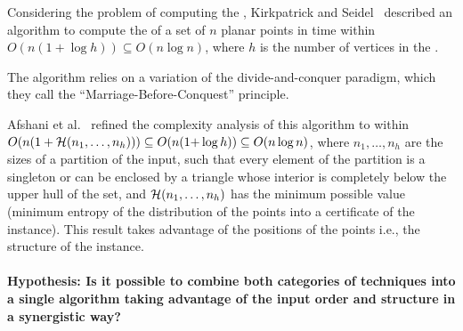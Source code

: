 Considering the problem of computing the {}, Kirkpatrick and Seidel~\cite{1986-JCom-TheUltimatePlanarConvexHullAlgorithm-KirkpatrickSeidel} described an algorithm to compute the {} of a set of $n$ planar points in time within $O(n(1+\log h))\subseteq O(n\log n)$, where $h$ is the number of vertices in the {}.
\begin{INUTILE}
  The algorithm relies on a variation of the divide-and-conquer
  paradigm, which they call the ``Marriage-Before-Conquest''
  principle.
\end{INUTILE}
Afshani et al.~\cite{2009-FOCS-InstanceOptimalGeometricAlgorithms-AfshaniBarbayChan} refined the complexity analysis of this algorithm to within $O(n(1+{\cal H}(n_1,\ldots,n_h)))\subseteq O(n(1{+}\log h)) \subseteq O(n\log{n})$, where $n_1, \dots, n_h$ are the sizes of a partition of the input, such that every element of the partition is a singleton or can be enclosed by a triangle whose interior is completely below the upper hull of the set, and ${\cal H}(n_1,\ldots,n_h)$ has the minimum possible value (minimum entropy of the distribution of the points into a certificate of the instance). This result takes advantage of the positions of the points i.e., the structure of the instance.


\paragraph{Hypothesis: Is it possible to combine both categories of
techniques into a single algorithm taking advantage of the input order
and structure in a synergistic way?}~\\


